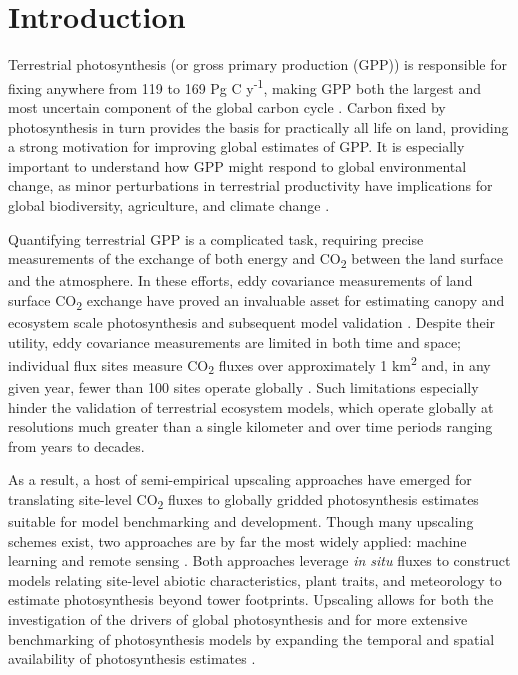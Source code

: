 \documentclass[10pt,letterpaper]{article}
\begin{document}

\section*{Introduction}
Terrestrial photosynthesis (or gross primary production (GPP)) is responsible for fixing anywhere from 119 to 169 Pg C y\textsuperscript{-1}, making GPP both the largest and most uncertain component of the global carbon cycle \cite{Anav2015}. Carbon fixed by photosynthesis in turn provides the basis for practically all life on land, providing a strong motivation for improving global estimates of GPP. It is especially important to understand how GPP might respond to global environmental change, as minor perturbations in terrestrial productivity have implications for global biodiversity, agriculture, and climate change \cite{rockstrom2009safe, running2012measurable}.

Quantifying terrestrial GPP is a complicated task, requiring precise measurements of the exchange of both energy and CO\textsubscript{2} between the land surface and the atmosphere. In these efforts, eddy covariance measurements of land surface CO\textsubscript{2} exchange have proved an invaluable asset for estimating canopy and ecosystem scale photosynthesis and subsequent model validation \cite{Baldocchi2001,baldocchi2008breathing}. Despite their utility, eddy covariance measurements are  limited in both time and space; individual flux sites measure CO\textsubscript{2} fluxes over approximately  1 km\textsuperscript{2} and, in any given year, fewer than 100 sites operate globally \cite{kumar2016}. Such limitations especially hinder the validation of terrestrial ecosystem models, which operate globally at resolutions much greater than a single kilometer and over time periods ranging from years to decades. 

As a result, a host of semi-empirical upscaling approaches have emerged for translating site-level CO\textsubscript{2} fluxes to globally gridded photosynthesis estimates suitable for model benchmarking and development. Though many upscaling schemes exist, two approaches are by far the most widely applied: machine learning \cite{beer2010terrestrial,tramontana2016predicting} and remote sensing \cite{Running2004}. Both approaches leverage \textit{in situ} fluxes to construct models relating site-level abiotic characteristics, plant traits, and meteorology to estimate photosynthesis beyond tower footprints. Upscaling allows for both the investigation of the drivers of global photosynthesis \cite{jung2017compensatory, zhao2010drought} and for more extensive benchmarking of photosynthesis models by expanding the temporal and spatial availability of photosynthesis estimates \cite{Bonan2011, Williams2009}. 
\end{document}
